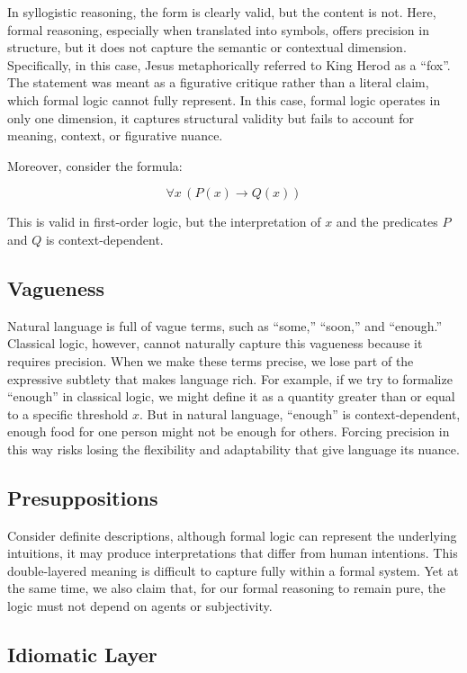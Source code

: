 \documentclass[12pt,a4paper,openany]{article}
\begin{document}
In syllogistic reasoning, the form is clearly valid, but the content is
not. Here, formal reasoning, especially when translated into symbols,
offers precision in structure, but it does not capture the semantic or
contextual dimension. Specifically, in this case, Jesus metaphorically
referred to King Herod as a ``fox''. The statement was meant as a
figurative critique rather than a literal claim, which formal logic
cannot fully represent. In this case, formal logic operates in only one
dimension, it captures structural validity but fails to account for
meaning, context, or figurative nuance.

Moreover, consider the formula:

\[
\forall x \, (P(x) \to Q(x))
\]

This is valid in first-order logic, but the interpretation of \(x\) and
the predicates \(P\) and \(Q\) is context-dependent.

\subsection{Vagueness}\label{vagueness}

Natural language is full of vague terms, such as ``some,'' ``soon,'' and
``enough.'' Classical logic, however, cannot naturally capture this
vagueness because it requires precision. When we make these terms
precise, we lose part of the expressive subtlety that makes language
rich. For example, if we try to formalize ``enough'' in classical logic,
we might define it as a quantity greater than or equal to a specific
threshold \(x\). But in natural language, ``enough'' is
context-dependent, enough food for one person might not be enough for
others. Forcing precision in this way risks losing the flexibility and
adaptability that give language its nuance.

\subsection{Presuppositions}\label{presuppositions}

Consider definite descriptions, although formal logic can represent the
underlying intuitions, it may produce interpretations that differ from
human intentions. This double-layered meaning is difficult to capture
fully within a formal system. Yet at the same time, we also claim that,
for our formal reasoning to remain pure, the logic must not depend on
agents or subjectivity.

\subsection{Idiomatic Layer}\label{idiomatic-layer}
\end{document}
